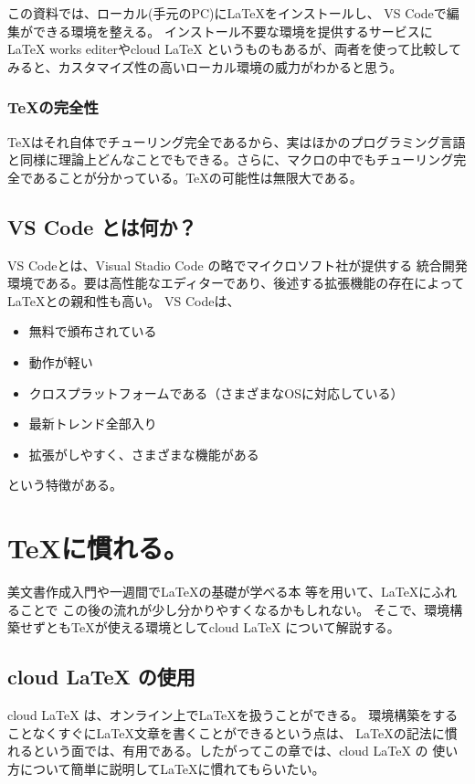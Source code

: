 \documentclass{ltjsarticle}
\begin{document}
この資料では、ローカル(手元のPC)に\LaTeX をインストールし、
VS Codeで編集ができる環境を整える。
インストール不要な環境を提供するサービスにLaTeX works editerやcloud LaTeX というものもあるが、両者を使って比較してみると、カスタマイズ性の高いローカル環境の威力がわかると思う。

\subsubsection*{\TeX の完全性}
\TeX はそれ自体でチューリング完全であるから、実はほかのプログラミング言語と同様に理論上どんなことでもできる。さらに、マクロの中でもチューリング完全であることが分かっている。\TeX の可能性は無限大である。

\subsection{VS Code とは何か？}
VS Codeとは、Visual Stadio Code の略でマイクロソフト社が提供する
統合開発環境である。要は高性能なエディターであり、後述する拡張機能の存在によって\LaTeX との親和性も高い。
VS Codeは、
\begin{itemize}
  \item 無料で頒布されている
  \item 動作が軽い
  \item クロスプラットフォームである（さまざまなOSに対応している）
  \item 最新トレンド全部入り
  \item 拡張がしやすく、さまざまな機能がある
\end{itemize}
という特徴がある。

\section{\TeX に慣れる。}
美文書作成入門\cite{美文書本}や一週間で\LaTeX の基礎が学べる本
\cite{一週間基礎}等を用いて、\LaTeX にふれることで
この後の流れが少し分かりやすくなるかもしれない。
そこで、環境構築せずとも\TeX が使える環境としてcloud LaTeX 
について解説する。

\subsection{cloud LaTeX の使用}
cloud LaTeX は、オンライン上で\LaTeX を扱うことができる。
環境構築をすることなくすぐにLaTeX文章を書くことができるという点は、
\LaTeX の記法に慣れるという面では、有用である。したがってこの章では、cloud LaTeX の
使い方について簡単に説明して\LaTeX に慣れてもらいたい。
\end{document}
